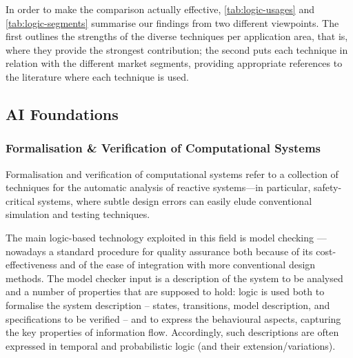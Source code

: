 \documentclass[12pt,a4paper,openright,twoside]{book}
\begin{document}
In order to make the comparison actually effective, \cref{tab:logic-usages} and \cref{tab:logic-segments} summarise our findings from two different viewpoints.
The first outlines the strengths of the diverse techniques per application area, that is, where they provide the strongest contribution; the second puts each technique in relation with the different market segments, providing appropriate references to the literature where each technique is used.



\subsection{AI Foundations}\label{ssec:ai-foundations}

\subsubsection{Formalisation \& Verification of Computational Systems}

Formalisation and verification of computational systems refer to a collection of techniques for the automatic analysis of reactive systems---in particular, safety-critical systems, where subtle design errors can easily elude conventional simulation and testing techniques.

The main logic-based technology exploited in this field is model checking \cite{ClarkeGP2001}---nowadays a standard procedure for quality assurance both because of its cost-effectiveness and of the ease of integration with more conventional design methods.
%
The model checker input is a description of the system to be analysed and a number of properties that are supposed to hold: logic is used both to formalise the system description -- states, transitions, model description, and specifications to be verified -- and to express the behavioural aspects, capturing the key properties of information flow.
%
Accordingly, such descriptions are often expressed in temporal and probabilistic logic (and their extension/variations).
%
\end{document}
